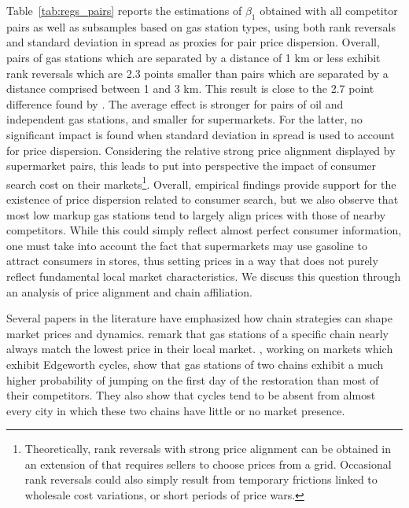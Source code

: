 \documentclass[english]{article}
\begin{document}
Table~\ref{tab:regs_pairs} reports the estimations of $\beta_1$ obtained with all competitor pairs as well as subsamples based on gas station types, using both rank reversals and standard deviation in spread as proxies for pair price dispersion. Overall, pairs of gas stations which are separated by a distance of 1 km or less exhibit rank reversals which are 2.3 points smaller than pairs which are separated by a distance comprised between 1 and 3 km. This result is close to the 2.7 point difference found by \cite{TAP11}. The average effect is stronger for pairs of oil and independent gas stations, and smaller for supermarkets. For the latter, no significant impact is found when standard deviation in spread is used to account for price dispersion. Considering the relative strong price alignment displayed by supermarket pairs, this leads to put into perspective the impact of consumer search cost on their markets\footnote{Theoretically, rank reversals with strong price alignment can be obtained in an extension of \cite{VAR80} that requires sellers to choose prices from a grid. Occasional rank reversals could also simply result from temporary frictions linked to wholesale cost variations, or short periods of price wars.}. Overall, empirical findings provide support for the existence of price dispersion related to consumer search, but we also observe that most low markup gas stations tend to largely align prices with those of nearby competitors. While this could simply reflect almost perfect consumer information, one must take into account the fact that supermarkets may use gasoline to attract consumers in stores, thus setting prices in a way that does not purely reflect fundamental local market characteristics. We discuss this question through an analysis of price alignment and chain affiliation.

Several papers in the literature have emphasized how chain strategies can shape market prices and dynamics. \cite{HOS08} remark that gas stations of a specific chain nearly always match the lowest price in their local market. \cite{LEW12}, working on markets which exhibit Edgeworth cycles, show that gas stations of two chains exhibit a much higher probability of jumping on the first day of the restoration than most of their competitors. They also show that cycles tend to be absent from almost every city in which these two chains have little or no market presence.
\end{document}
